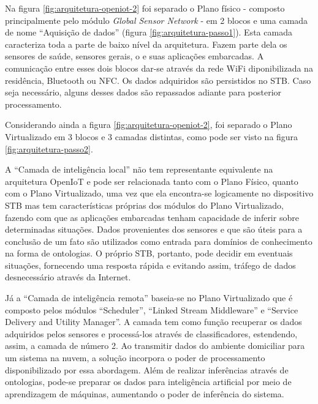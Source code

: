
Na figura \ref{fig:arquitetura-openiot-2} foi separado o Plano físico -
composto principalmente pelo módulo \textit{Global Sensor Network} -
em 2 blocos e uma camada de nome ``Aquisição de dados'' (figura
\ref{fig:arquitetura-passo1}). Esta camada caracteriza toda a parte de baixo
nível da arquitetura. Fazem parte dela os sensores de saúde, sensores gerais, o
\stb[] e suas aplicações embarcadas. A comunicação entre esses dois blocos
dar-se através da rede WiFi diponibilizada na residência, Bluetooth ou NFC. Os
dados adquiridos são persistidos no STB. Caso seja necessário, alguns desses
dados são repassados adiante para posterior processamento. 


Considerando ainda a figura \ref{fig:arquitetura-openiot-2}, foi separado o Plano
Virtualizado em 3 blocos e 3 camadas distintas, como pode ser visto na figura
\ref{fig:arquitetura-passo2}. 


A ``Camada de inteligência local'' não tem representante equivalente na
arquitetura OpenIoT e pode ser relacionada tanto com o Plano Físico, quanto com
o Plano Virtualizado, uma vez que ela encontra-se logicamente no dispositivo
STB mas tem características próprias dos módulos do Plano Virtualizado, 
fazendo com que as aplicações embarcadas tenham capacidade de inferir sobre
determinadas situações. Dados provenientes dos sensores e que são úteis para a
conclusão de um fato são utilizados como entrada para domínios de conhecimento
na forma de ontologias. O próprio STB, portanto, pode decidir em eventuais
situações, fornecendo uma resposta rápida e evitando assim, tráfego de dados
desnecessário através da Internet.

Já a ``Camada de inteligência remota'' baseia-se no Plano Virtualizado que
é composto pelos módulos ``Scheduler'', ``Linked Stream Middleware'' e ``Service
Delivery and Utility Manager''. A camada tem como função recuperar os dados
adquiridos pelos sensores e processá-los através de classificadores,
estendendo, assim, a camada de número 2. Ao transmitir dados do ambiente
domiciliar para um sistema na nuvem, a solução incorpora o poder de
processamento disponibilizado por essa abordagem. Além de realizar inferências
através de ontologias, pode-se preparar os dados para inteligência artificial
por meio de aprendizagem de máquinas, aumentando o poder de inferência do
sistema.

